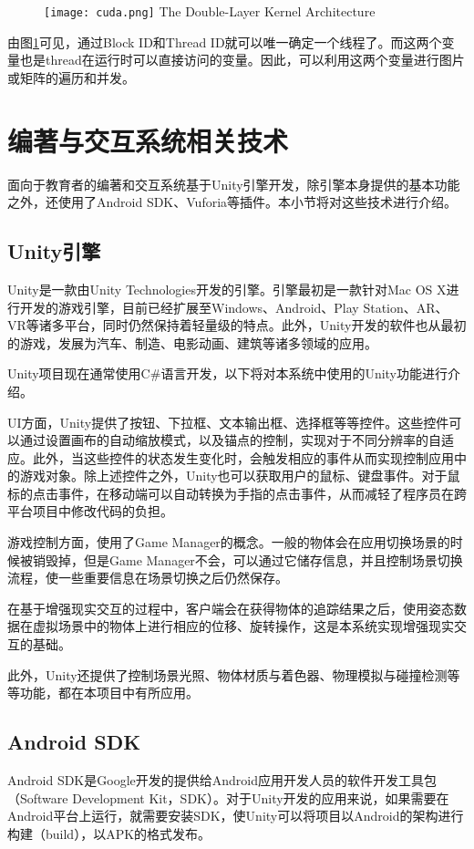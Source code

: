 \begin{figure}[!htp]
  \centering
  \texttt{[image: cuda.png]}
    {The Double-Layer Kernel Architecture }
 \label{fig:ceda}
\end{figure}

由图\ref{fig:ceda}可见，通过Block ID和Thread ID就可以唯一确定一个线程了。而这两个变量也是thread在运行时可以直接访问的变量。因此，可以利用这两个变量进行图片或矩阵的遍历和并发。

\section{编著与交互系统相关技术}
面向于教育者的编著和交互系统基于Unity引擎开发，除引擎本身提供的基本功能之外，还使用了Android SDK、Vuforia等插件。本小节将对这些技术进行介绍。

\subsection{Unity引擎}
Unity\cite{Unity}是一款由Unity Technologies开发的引擎。引擎最初是一款针对Mac OS X进行开发的游戏引擎，目前已经扩展至Windows、Android、Play Station、AR、VR等诸多平台，同时仍然保持着轻量级的特点。此外，Unity开发的软件也从最初的游戏，发展为汽车、制造、电影动画、建筑等诸多领域的应用。

Unity项目现在通常使用C\#语言开发，以下将对本系统中使用的Unity功能进行介绍。
	
UI方面，Unity提供了按钮、下拉框、文本输出框、选择框等等控件。这些控件可以通过设置画布的自动缩放模式，以及锚点的控制，实现对于不同分辨率的自适应。此外，当这些控件的状态发生变化时，会触发相应的事件从而实现控制应用中的游戏对象。除上述控件之外，Unity也可以获取用户的鼠标、键盘事件。对于鼠标的点击事件，在移动端可以自动转换为手指的点击事件，从而减轻了程序员在跨平台项目中修改代码的负担。

游戏控制方面，使用了Game Manager的概念。一般的物体会在应用切换场景的时候被销毁掉，但是Game Manager不会，可以通过它储存信息，并且控制场景切换流程，使一些重要信息在场景切换之后仍然保存。

在基于增强现实交互的过程中，客户端会在获得物体的追踪结果之后，使用姿态数据在虚拟场景中的物体上进行相应的位移、旋转操作，这是本系统实现增强现实交互的基础。

此外，Unity还提供了控制场景光照、物体材质与着色器、物理模拟与碰撞检测等等功能，都在本项目中有所应用。

\subsection{Android SDK}
Android SDK\cite{Android}是Google开发的提供给Android应用开发人员的软件开发工具包（Software Development Kit，SDK）。对于Unity开发的应用来说，如果需要在Android平台上运行，就需要安装SDK，使Unity可以将项目以Android的架构进行构建（build），以APK的格式发布。

